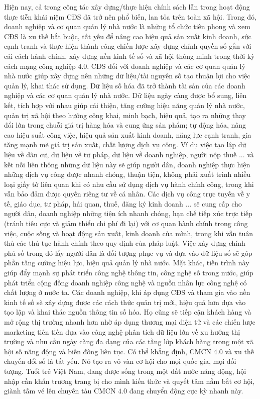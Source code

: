 \begin{multicols}{2}
	\vskip 0.05cm
	Hiện nay, cả trong công tác xây dựng/thực hiện chính sách lẫn trong hoạt động thực tiễn khái niệm CĐS đã trở nên phổ biến, lan tỏa trên toàn xã hội. Trong đó, doanh nghiệp và cơ quan quản lý nhà nước là những tổ chức tiên phong và xem CĐS là xu thế bắt buộc, tất yếu để nâng cao hiệu quả sản xuất kinh doanh, sức cạnh tranh và thực hiện thành công chiến lược xây dựng chính quyền số gắn với cải cách hành chính, xây dựng nền kinh tế số và xã hội thông minh trong thời kỳ cách mạng công nghiệp $4{.}0$.
	\vskip 0.05cm
	CĐS đối với doanh nghiệp và các cơ quan quản lý nhà nước giúp xây dựng nên những dữ liệu/tài nguyên số tạo thuận lợi cho việc quản lý, khai thác sử dụng. Dữ liệu số hóa đã trở thành tài sản của các doanh nghiệp và các cơ quan quản lý nhà nước. Dữ liệu ngày càng được bổ sung, liên kết, tích hợp với nhau giúp cải thiện, tăng cường hiệu năng quản lý nhà nước, quản trị xã hội theo hướng công khai, minh bạch, hiệu quả, tạo ra những thay đổi lớn trong chuỗi giá trị hàng hóa và cung ứng sản phẩm; tự động hóa, nâng cao hiệu suất công việc, hiệu quả sản xuất kinh doanh, năng lực cạnh tranh, gia tăng mạnh mẽ giá trị sản xuất, chất lượng dịch vụ công.
	\vskip 0.05cm
	Ví dụ việc tạo lập dữ liệu về dân cư, dữ liệu về tư pháp, dữ liệu về doanh nghiệp, người nộp thuế ... và kết nối liên thông những dữ liệu này sẽ giúp người dân, doanh nghiệp thực hiện những dịch vụ công được nhanh chóng, thuận tiện, không phải xuất trình nhiều loại giấy tờ liên quan khi có nhu cầu sử dụng dịch vụ hành chính công, trong khi vẫn bảo đảm được quyền riêng tư về cá nhân. Các dịch vụ công trực tuyến về y tế, giáo dục, tư pháp, hải quan, thuế, đăng ký kinh doanh ... sẽ cung cấp cho người dân, doanh nghiệp những tiện ích nhanh chóng, hạn chế tiếp xúc trực tiếp (tránh tiêu cực và giảm thiểu chi phí đi lại) với cơ quan hành chính trong công việc, cuộc sống và hoạt động sản xuất, kinh doanh của mình, trong khi vẫn tuân thủ các thủ tục hành chính theo quy định của pháp luật. Việc xây dựng chính phủ số trong đó lấy người dân là đối tượng phục vụ và dựa vào dữ liệu số sẽ góp phần tăng cường hiệu lực, hiệu quả quản lý nhà nước. Mặt khác, tiến trình này giúp đẩy mạnh sự phát triển công nghệ thông tin, công nghệ số trong nước, giúp phát triển cộng đồng doanh nghiệp công nghệ và nguồn nhân lực công nghệ có chất lượng ở nước ta.
	\vskip 0.05cm
	Các doanh nghiệp, khi áp dụng CĐS và tham gia vào nền kinh tế số sẽ xây dựng được các cách thức quản trị mới, hiệu quả hơn dựa vào tạo lập và khai thác nguồn thông tin số hóa. Họ cũng sẽ tiếp cận khách hàng và mở rộng thị trường nhanh hơn nhờ áp dụng thương mại điện tử và các chiến lược marketing tiên tiến dựa vào công nghệ phân tích dữ liệu lớn về xu hướng thị trường và nhu cầu ngày càng đa dạng của các tầng lớp khách hàng trong một xã hội số năng động và biến đông liên tục.
	\vskip 0.05cm
	Có thể khẳng định, CMCN $4{.}0$ và xu thế chuyển đổi số là tất yếu. Nó tạo ra vô vàn cơ hội cho mọi quốc gia, mọi đối tượng. Tuổi trẻ Việt Nam, đang được sống trong một đất nước năng động, hội nhập cần khẩn trương trang bị cho mình kiến thức và quyết tâm nắm bắt cơ hội, giành tấm vé lên chuyến tàu CMCN $4{.}0$ đang chuyển động cực kỳ nhanh này.
\end{multicols}

